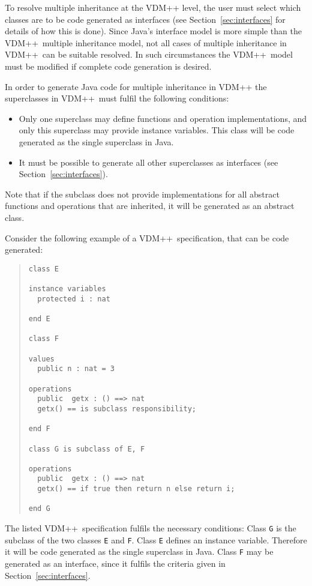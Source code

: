 \documentclass[\pformat,11pt]{article}
\newcommand{\VDM}{VDM++}
\begin{document}
To resolve multiple inheritance at the VDM++ level, the user must
select which classes are to be code generated as interfaces (see
Section~\ref{sec:interfaces} for details of how this is done).
Since Java's interface model is more simple than the \VDM\ multiple
inheritance model, not all cases of multiple inheritance in \VDM\ can
be suitable resolved. In such circumstances the \VDM\ model must be
modified if complete code generation is desired. 


In order to generate Java
code for multiple inheritance in \VDM{} the superclasses in \VDM\ 
must fulfil the following conditions:

\begin{itemize}
\item Only one superclass may define functions and operation
  implementations, and only this superclass may provide instance
  variables. This class will be code generated as the single
  superclass in Java. 
\item It must be possible to generate all other superclasses as
  interfaces (see Section~\ref{sec:interfaces}).
\end{itemize}
Note that if the subclass does not provide implementations for all
abstract functions and operations that are inherited, it will be
generated as an abstract class.

Consider the following example of a \VDM\ specification, that can be
code generated: 

\begin{quote}
\begin{small}
\begin{verbatim}
class E

instance variables
  protected i : nat

end E

class F

values
  public n : nat = 3

operations
  public  getx : () ==> nat
  getx() == is subclass responsibility;

end F

class G is subclass of E, F

operations
  public  getx : () ==> nat
  getx() == if true then return n else return i;

end G
\end{verbatim}
\end{small}
\end{quote}

The listed \VDM\ specification fulfils the necessary conditions:
Class {\tt G} is the subclass of the two classes {\tt E} and {\tt F}.
Class {\tt E} defines an instance variable. Therefore it will be code
generated as the single superclass in Java. Class {\tt F} may be
generated as an interface, since it fulfils the criteria given in
Section~\ref{sec:interfaces}. 
\end{document}
